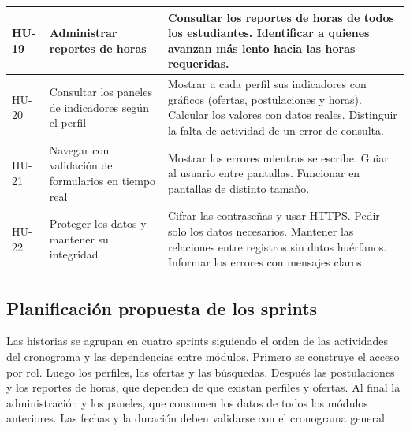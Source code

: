 \begin{longtable}{@{}>{\raggedright\arraybackslash}p{2.2cm}>{\raggedright\arraybackslash}p{4.5cm}>{\raggedright\arraybackslash}p{9.3cm}@{}}
	\hline
	HU-19 & Administrar reportes de horas & Consultar los reportes de horas de todos los estudiantes. Identificar a quienes avanzan más lento hacia las horas requeridas. \\
	\hline
	HU-20 & Consultar los paneles de indicadores según el perfil & Mostrar a cada perfil sus indicadores con gráficos (ofertas, postulaciones y horas). Calcular los valores con datos reales. Distinguir la falta de actividad de un error de consulta. \\
	\hline
	HU-21 & Navegar con validación de formularios en tiempo real & Mostrar los errores mientras se escribe. Guiar al usuario entre pantallas. Funcionar en pantallas de distinto tamaño. \\
	\hline
	HU-22 & Proteger los datos y mantener su integridad & Cifrar las contraseñas y usar HTTPS. Pedir solo los datos necesarios. Mantener las relaciones entre registros sin datos huérfanos. Informar los errores con mensajes claros. \\
\end{longtable}

\subsection{Planificación propuesta de los sprints}
Las historias se agrupan en cuatro sprints siguiendo el orden de las actividades del cronograma y
las dependencias entre módulos. Primero se construye el acceso por rol. Luego los perfiles, las
ofertas y las búsquedas. Después las postulaciones y los reportes de horas, que dependen de que
existan perfiles y ofertas. Al final la administración y los paneles, que consumen los datos de
todos los módulos anteriores. Las fechas y la duración deben validarse con el cronograma
general.


